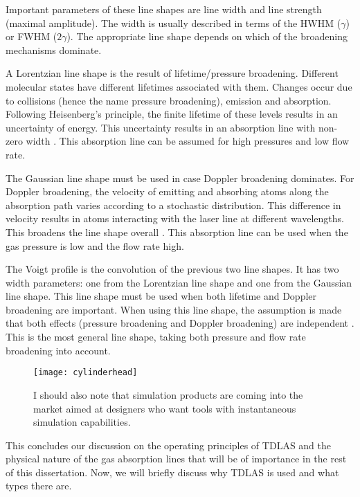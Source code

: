 \documentclass[\home/main.tex]{subfiles}
\begin{document}
  Important parameters of these line shapes are line width and line strength (maximal amplitude). The width is usually described in terms of the \acrfull{HWHM} ($\gamma$) or \acrfull{FWHM} ($2\gamma$). The appropriate line shape depends on which of the broadening mechanisms dominate.
  
  A Lorentzian line shape is the result of lifetime/pressure broadening. Different molecular states have different lifetimes associated with them. Changes occur due to collisions (hence the name pressure broadening), emission and absorption. Following Heisenberg's principle, the finite lifetime of these levels results in an uncertainty of energy. This uncertainty results in an absorption line with non-zero width \cite{spectrochemical-analysis}. This absorption line can be assumed for high pressures and low flow rate.
  
  The Gaussian line shape must be used in case Doppler broadening dominates. For Doppler broadening, the velocity of emitting and absorbing atoms along the absorption path varies according to a stochastic distribution. This difference in velocity results in atoms interacting with the laser line at different wavelengths. This broadens the line shape overall \cite{spectrochemical-analysis}. This absorption line can be used when the gas pressure is low and the flow rate high.
  
  The Voigt profile is the convolution of the previous two line shapes. It has two width parameters: one from the Lorentzian line shape and one from the Gaussian line shape. This line shape must be used when both lifetime and Doppler broadening are important. When using this line shape, the assumption is made that both effects (pressure broadening and Doppler broadening) are independent \cite{misunderstanding-voigt,spectrochemical-analysis}. This is the most general line shape, taking both pressure and flow rate broadening into account.
  
  \begin{figure}[]
    \texttt{[image: cylinderhead]}
    \caption{I should also note that simulation products are coming into the market aimed at designers who want tools with instantaneous simulation capabilities.}
  \end{figure}
  
  This concludes our discussion on the operating principles of \acrshort{TDLAS} and the physical nature of the gas absorption lines that will be of importance in the rest of this dissertation. Now, we will briefly discuss why \acrshort{TDLAS} is used and what types there are.
\end{document}

